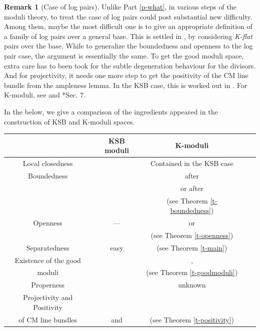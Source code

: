 \documentclass[12pt,reqno]{amsart}%
\theoremstyle{definition}
\newtheorem{rem}[thm]{Remark}
\theoremstyle{remark}
\begin{document}
\begin{rem}[Case of log pairs] Unlike Part \ref{p-what}, in various steps of the moduli theory, to treat the case of log pairs could post substantial new difficulty. Among them, maybe the most difficult one is to give an appropriate definition of a family of log pairs over a general base. This is settled in \cite{Kol19}, by considering {\it K-flat} pairs over the base. While to generalize the boundedness and openness to the log pair case, the argument is essentially the same. To get the good moduli space, extra care has to been took for the subtle degeneration behaviour for the divisors. And for projectivity, it needs one more step to get the positivity of the CM line bundle from the ampleness lemma.  In the KSB case, this is worked out in \cite{KP17}. For K-moduli, see \cite{Pos19} and \cite{XZ19}*{Sec. 7}. 
\end{rem}

\medskip

In the below, we give a comparison of the ingredients appeared in the construction of KSB and K-moduli spaces. 

{\small

\begin{center}
\vspace{4mm}

\begin{tabular}{ | c | c | c | c | c |   }
 \hline
      & KSB moduli & K-moduli \\
 \hline       
Local closedness &\cite{Kol08, AH11, Kol19}  &  Contained in the KSB case\\
 \hline       
 Boundedness &\cite{HMX18}  &  \cite{Jia17} after \cite{Bir19} \\     
  & & or \cite{XZ20} after \cite{HMX14}\\
    &  &  (see Theorem \ref{t-boundedness})\\
 \hline
 Openness & --- & \cite{Xu19} or \cite{BLX19} \\
     &  &  (see Theorem \ref{t-openness})\\
 \hline
Separatedness & easy & \cite{BX19} (see Theorem \ref{t-main})\\
 \hline
Existence of the  good & \cite{Kol97, KM97}&\cite{AHH18}, \cite{ABHX19}\\
   moduli  &  &  (see Theorem \ref{t-goodmoduli})\\
 \hline
Properness & \cite{BCHM10, HX13, Kol13}& unknown \\
 \hline
Projectivity and Positivity&\cite{Kol90, Fujino18, KP17} &  \cites{CP18, XZ19} \\
 of CM line bundles  & and \cite{PX17} &  (see Theorem \ref{t-positivity})\\
 \hline
\end{tabular}


\end{center}

}
\end{document}
